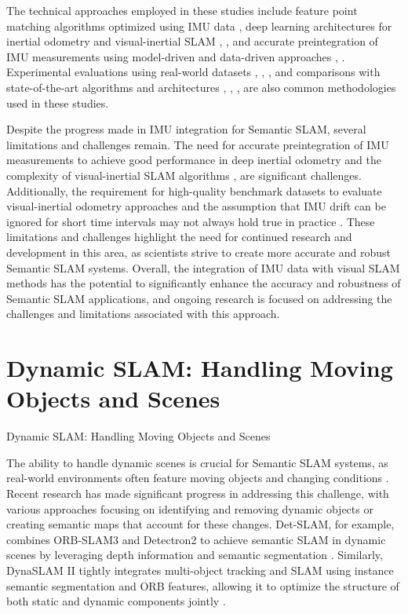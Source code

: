 \documentclass[conference]{IEEEtran}
\begin{document}
The technical approaches employed in these studies include feature point matching algorithms optimized using IMU data \cite{b1}, deep learning architectures for inertial odometry and visual-inertial SLAM \cite{b2}, \cite{b3}, and accurate preintegration of IMU measurements using model-driven and data-driven approaches \cite{b2}, \cite{b5}. Experimental evaluations using real-world datasets \cite{b1}, \cite{b2}, \cite{b3}, \cite{b4} and comparisons with state-of-the-art algorithms and architectures \cite{b1}, \cite{b2}, \cite{b3}, \cite{b5} are also common methodologies used in these studies.

Despite the progress made in IMU integration for Semantic SLAM, several limitations and challenges remain. The need for accurate preintegration of IMU measurements to achieve good performance in deep inertial odometry \cite{b2} and the complexity of visual-inertial SLAM algorithms \cite{b1}, \cite{b3} are significant challenges. Additionally, the requirement for high-quality benchmark datasets to evaluate visual-inertial odometry approaches \cite{b4} and the assumption that IMU drift can be ignored for short time intervals may not always hold true in practice \cite{b5}. These limitations and challenges highlight the need for continued research and development in this area, as scientists strive to create more accurate and robust Semantic SLAM systems. Overall, the integration of IMU data with visual SLAM methods has the potential to significantly enhance the accuracy and robustness of Semantic SLAM applications, and ongoing research is focused on addressing the challenges and limitations associated with this approach.

\section{Dynamic SLAM: Handling Moving Objects and Scenes}
Dynamic SLAM: Handling Moving Objects and Scenes

The ability to handle dynamic scenes is crucial for Semantic SLAM systems, as real-world environments often feature moving objects and changing conditions \cite{b1}. Recent research has made significant progress in addressing this challenge, with various approaches focusing on identifying and removing dynamic objects or creating semantic maps that account for these changes. Det-SLAM, for example, combines ORB-SLAM3 and Detectron2 to achieve semantic SLAM in dynamic scenes by leveraging depth information and semantic segmentation \cite{b2}. Similarly, DynaSLAM II tightly integrates multi-object tracking and SLAM using instance semantic segmentation and ORB features, allowing it to optimize the structure of both static and dynamic components jointly \cite{b3}.
\end{document}
